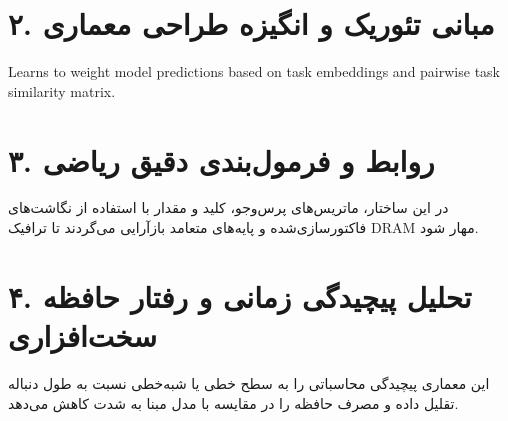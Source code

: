 \documentclass[12pt,a4paper]{article}
\begin{document}
\section*{۲. مبانی تئوریک و انگیزه طراحی معماری}
Learns to weight model predictions based on task embeddings and pairwise task similarity matrix.

\section*{۳. روابط و فرمول‌بندی دقیق ریاضی}
در این ساختار، ماتریس‌های پرس‌وجو، کلید و مقدار با استفاده از نگاشت‌های فاکتورسازی‌شده و پایه‌های متعامد بازآرایی می‌گردند تا ترافیک DRAM مهار شود.

\section*{۴. تحلیل پیچیدگی زمانی و رفتار حافظه سخت‌افزاری}
این معماری پیچیدگی محاسباتی را به سطح خطی یا شبه‌خطی نسبت به طول دنباله تقلیل داده و مصرف حافظه را در مقایسه با مدل مبنا به شدت کاهش می‌دهد.
\end{document}

